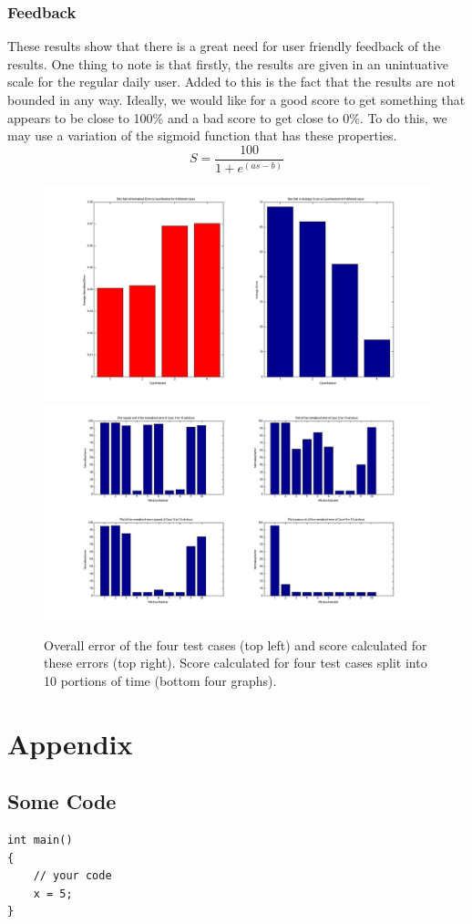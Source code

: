 \documentclass[a4paper]{article}
\begin{document}
\subsubsection{Feedback}
\noindent
These results show that there is a great need for user friendly feedback of the results. One thing to note is that firstly, the results are given in an unintuative scale for the regular daily user. Added to this is the fact that the results are not bounded in any way. Ideally, we would like for a good score to get something that appears to be close to 100\% and a bad score to get close to 0\%. To do this, we may use a variation of the sigmoid function that has these properties.
\begin{equation}
S = \frac{100}{1+e^{\left(as-b\right)}}
\end{equation}

\begin{figure}[H]
\centering
\includegraphics[scale=0.2]{Data_Analysis_Average_Score.jpg}
\includegraphics[scale=0.2]{Data_Analysis_Window_Score.jpg}

\caption{Overall error of the four test cases (top left) and score calculated for these errors (top right). Score calculated for four test cases split into 10 portions of time (bottom four graphs).}
\label{error_score}
\end{figure}


\clearpage
\section*{Appendix}
\subsection*{Some Code}
\begin{lstlisting}
int main()
{
	// your code
	x = 5;
}

\end{lstlisting}
\end{document}
